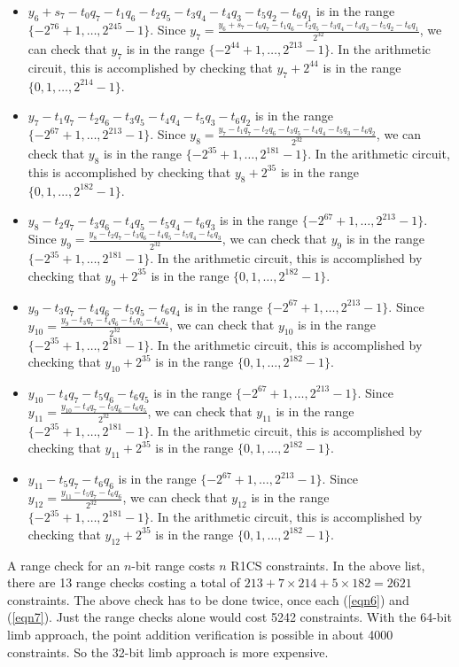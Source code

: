 \documentclass[a4paper, 12pt]{article}
\begin{document}
\begin{itemize}
  \item $y_6+s_7-t_0q_7-t_1q_6-t_2q_5-t_3q_4-t_4q_3-t_5q_2-t_6q_1$ is in the range $\{-2^{76}+1,\ldots, 2^{245}-1\}$. Since $y_7 = \frac{y_6+s_7-t_0q_7-t_1q_6-t_2q_5-t_3q_4-t_4q_3-t_5q_2-t_6q_1}{2^{32}}$, we can check that $y_7$ is in the range $\{-2^{44}+1,\ldots, 2^{213}-1\}$. In the arithmetic circuit, this is accomplished by checking that $y_7 + 2^{44}$ is in the range $\{0,1,\ldots,2^{214}-1\}$.
  \item $y_7-t_1q_7-t_2q_6-t_3q_5-t_4q_4-t_5q_3-t_6q_2$ is in the range $\{-2^{67}+1,\ldots, 2^{213}-1\}$. Since $y_8 = \frac{y_7-t_1q_7-t_2q_6-t_3q_5-t_4q_4-t_5q_3-t_6q_2}{2^{32}}$, we can check that $y_8$ is in the range $\{-2^{35}+1,\ldots, 2^{181}-1\}$. In the arithmetic circuit, this is accomplished by checking that $y_8 + 2^{35}$ is in the range $\{0,1,\ldots,2^{182}-1\}$.
  \item $y_8-t_2q_7-t_3q_6-t_4q_5-t_5q_4-t_6q_3$ is in the range $\{-2^{67}+1,\ldots, 2^{213}-1\}$. Since $y_9 = \frac{y_8-t_2q_7-t_3q_6-t_4q_5-t_5q_4-t_6q_3}{2^{32}}$, we can check that $y_9$ is in the range $\{-2^{35}+1,\ldots, 2^{181}-1\}$. In the arithmetic circuit, this is accomplished by checking that $y_9 + 2^{35}$ is in the range $\{0,1,\ldots,2^{182}-1\}$.
  \item $y_9-t_3q_7-t_4q_6-t_5q_5-t_6q_4$ is in the range $\{-2^{67}+1,\ldots, 2^{213}-1\}$. Since $y_{10} = \frac{y_9-t_3q_7-t_4q_6-t_5q_5-t_6q_4}{2^{32}}$, we can check that $y_{10}$ is in the range $\{-2^{35}+1,\ldots, 2^{181}-1\}$. In the arithmetic circuit, this is accomplished by checking that $y_{10} + 2^{35}$ is in the range $\{0,1,\ldots,2^{182}-1\}$.
  \item $y_{10}-t_4q_7-t_5q_6-t_6q_5$ is in the range $\{-2^{67}+1,\ldots, 2^{213}-1\}$. Since $y_{11} = \frac{y_{10}-t_4q_7-t_5q_6-t_6q_5}{2^{32}}$, we can check that $y_{11}$ is in the range $\{-2^{35}+1,\ldots, 2^{181}-1\}$. In the arithmetic circuit, this is accomplished by checking that $y_{11} + 2^{35}$ is in the range $\{0,1,\ldots,2^{182}-1\}$.
  \item $y_{11}-t_5q_7-t_6q_6$ is in the range $\{-2^{67}+1,\ldots, 2^{213}-1\}$. Since $y_{12} = \frac{y_{11}-t_5q_7-t_6q_6}{2^{32}}$, we can check that $y_{12}$ is in the range $\{-2^{35}+1,\ldots, 2^{181}-1\}$. In the arithmetic circuit, this is accomplished by checking that $y_{12} + 2^{35}$ is in the range $\{0,1,\ldots,2^{182}-1\}$.
\end{itemize}

A range check for an $n$-bit range costs $n$ R1CS constraints. In the above list, there are 13 range checks costing a total of $213 + 7\times 214 + 5\times 182 = 2621$ constraints. The above check has to be done twice, once each (\ref{eqn6}) and (\ref{eqn7}). Just the range checks alone would cost 5242 constraints. With the 64-bit limb approach, the point addition verification is possible in about 4000 constraints. So the 32-bit limb approach is more expensive.
\end{document}
